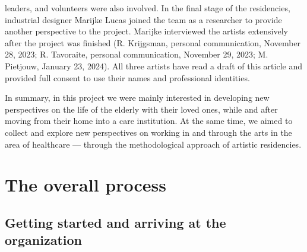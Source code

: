 \documentclass[authordate, empirical,issue]{jote-new-article}
\begin{document}
{leaders, and volunteers were also involved. In the final stage of the residencies, industrial designer Marijke Lucas joined the team as a researcher to provide another perspective to the project. Marijke interviewed the artists extensively after the project was finished (R. Krijgsman, personal communication, November 28, 2023; R. Tavoraite, personal communication, November 29, 2023; M. Pietjouw, January 23, 2024). All three artists have read a draft of this article and provided full consent to use their names and professional identities.


	}

	





	In summary, in this project we were mainly interested in developing new perspectives on the life of the elderly with their loved ones, while and after moving from their home into a care institution. At the same time, we aimed to collect and explore new perspectives on working in and through the arts in the area of healthcare --- through the methodological approach of artistic residencies.







	\section{The overall process}



	\subsection{Getting started and arriving at the organization }
\end{document}
